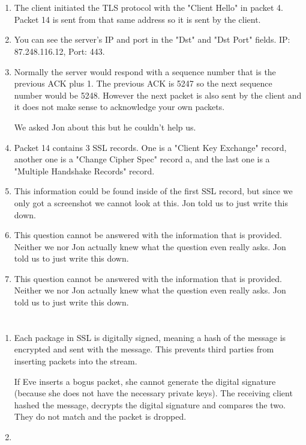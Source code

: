 \documentclass[12pt, a4paper]{article}
\begin{document}
\section{} %
\begin{enumerate}[a]
	\item %
	The client initiated the TLS protocol with the "Client Hello" in packet 4. Packet 14 is sent from that same address so it is sent by the client.
	\item %
	You can see the server's IP and port in the "Dst" and "Dst Port" fields. IP: 87.248.116.12, Port: 443.
	\item %
	Normally the server would respond with a sequence number that is the previous ACK plus 1. The previous ACK is 5247 so the next sequence number would be 5248. However the next packet is also sent by the client and it does not make sense to acknowledge your own packets.

	We asked Jon about this but he couldn't help us.
	\item %
	Packet 14 contains 3 SSL records. One is a "Client Key Exchange" record, another one is a "Change Cipher Spec" record a, and the last one is a "Multiple Handshake Records" record.
	\item %
	This information could be found inside of the first SSL record, but since we only got a screenshot we cannot look at this. Jon told us to just write this down.
	\item %
	This question cannot be answered with the information that is provided. Neither we nor Jon actually knew what the question even really asks. Jon told us to just write this down.
	\item %
	This question cannot be answered with the information that is provided. Neither we nor Jon actually knew what the question even really asks. Jon told us to just write this down.
\end{enumerate}

\section{} %
\begin{enumerate}[a]
	\item %
	Each package in SSL is digitally signed, meaning a hash of the message is encrypted and sent with the message. This prevents third parties from inserting packets into the stream.

	If Eve inserts a bogus packet, she cannot generate the digital signature (because she does not have the necessary private keys). The receiving client hashed the message, decrypts the digital signature and compares the two. They do not match and the packet is dropped.
	\item %
\end{enumerate}
\end{document}
